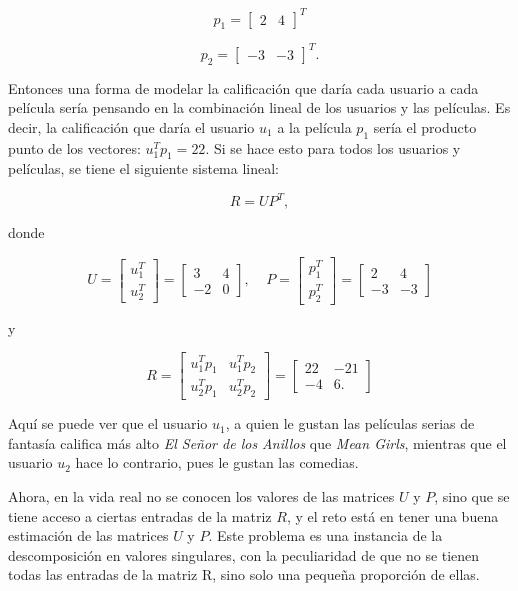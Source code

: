 \[
    p_1 = 
    \begin{bmatrix}
         2 & 4
    \end{bmatrix}^{T}
\]


\[
    p_2 = 
    \begin{bmatrix}
         -3 & -3
    \end{bmatrix}^{T}.
\]

Entonces una forma de modelar la calificación que daría cada usuario a cada película sería pensando en la combinación lineal de los usuarios y las películas. Es decir, la calificación que daría el usuario $u_1$ a la película $p_1$ sería el producto punto de los vectores: $u_1^T p_1 = 22$. Si se hace esto para todos los usuarios y películas, se tiene el siguiente sistema lineal:

\[
    R = UP^T,
\]


donde

\[
    U = 
    \begin{bmatrix}
         u_1^T \\ 
         u_2^T
    \end{bmatrix} =
    \begin{bmatrix}
         3 & 4 \\ 
         -2 & 0
    \end{bmatrix},\;\;\;\;
    P = 
    \begin{bmatrix}
         p_1^T \\ 
         p_2^T
    \end{bmatrix} =
    \begin{bmatrix}
         2 & 4 \\ 
         -3 & -3
    \end{bmatrix}
\]

y

\[
    R = 
    \begin{bmatrix}
         u_1 ^T p_1 & u_1 ^T p_2 \\ 
         u_2 ^T p_1 & u_2 ^T p_2
    \end{bmatrix}
    =
    \begin{bmatrix}
        22 & -21 \\
        -4 & 6.
    \end{bmatrix}
\]

Aquí se puede ver que el usuario $u_1$, a quien le gustan las películas serias de fantasía califica más alto \textit{El Señor de los Anillos} que \textit{Mean Girls}, mientras que el usuario $u_2$ hace lo contrario, pues le gustan las comedias.

Ahora, en la vida real no se conocen los valores de las matrices $U$ y $P$, sino que se tiene acceso a ciertas entradas de la matriz $R$, y el reto está en tener una buena estimación de las matrices $U$ y $P$. Este problema es una instancia de la descomposición en valores singulares, con la peculiaridad de que no se tienen todas las entradas de la matriz R, sino solo una pequeña proporción de ellas.


